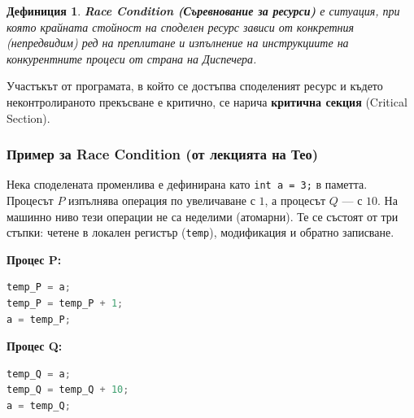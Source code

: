 \documentclass{scrartcl}
\newtheorem{definition}{Дефиниция}
\begin{document}
\begin{FlushLeft}
\begin{definition}
\textbf{Race Condition (Съревнование за ресурси)} е ситуация, при която крайната стойност на споделен ресурс зависи от конкретния (непредвидим) ред на преплитане и изпълнение на инструкциите на конкурентните процеси от страна на Диспечера.
\end{definition}

Участъкът от програмата, в който се достъпва споделеният ресурс и където неконтролираното прекъсване е критично, се нарича \textbf{критична секция} (Critical Section).

\subsubsection{Пример за Race Condition (от лекцията на Тео)}
Нека споделената променлива е дефинирана като \lstinline|int a = 3;| в паметта.
Процесът $P$ изпълнява операция по увеличаване с $1$, а процесът $Q$ --- с $10$. На машинно ниво тези операции не са неделими (атомарни). Те се състоят от три стъпки: четене в локален регистър (\lstinline|temp|), модификация и обратно записване.

\begin{minipage}{0.45\textwidth}
\textbf{Процес P:}
\begin{lstlisting}[language=C++]
temp_P = a;
temp_P = temp_P + 1;
a = temp_P;
\end{lstlisting}
\end{minipage}
\hfill
\begin{minipage}{0.45\textwidth}
\textbf{Процес Q:}
\begin{lstlisting}[language=C++]
temp_Q = a;
temp_Q = temp_Q + 10;
a = temp_Q;
\end{lstlisting}
\end{minipage}

\vspace{0.3cm}


\end{FlushLeft}
\end{document}
